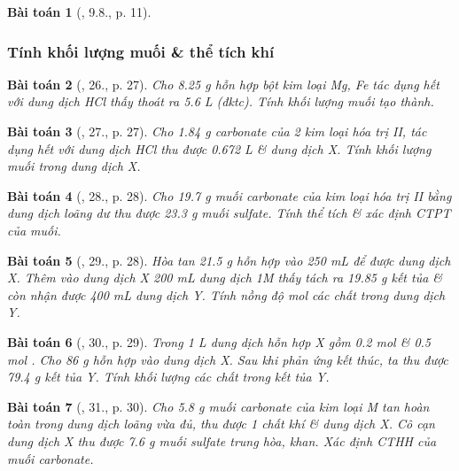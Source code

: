 \documentclass{article}
\newtheorem{baitoan}{Bài toán}
\begin{document}
\begin{baitoan}[\cite{SBT_Hoa_Hoc_9}, 9.8., p. 11]
	
\end{baitoan}

\subsubsection{Tính khối lượng muối \& thể tích khí }

\begin{baitoan}[\cite{An_350_BT_Hoa_Hoc_9}, 26., p. 27]
	Cho \emph{8.25 g} hỗn hợp bột kim loại \emph{Mg, Fe} tác dụng hết với dung dịch \emph{HCl} thấy thoát ra \emph{5.6 L } (đktc). Tính khối lượng muối tạo thành.
\end{baitoan}

\begin{baitoan}[\cite{An_350_BT_Hoa_Hoc_9}, 27., p. 27]
	Cho \emph{1.84 g} carbonate của 2 kim loại hóa trị II, tác dụng hết với dung dịch \emph{HCl} thu được \emph{0.672 L } \& dung dịch X. Tính khối lượng muối trong dung dịch X.
\end{baitoan}

\begin{baitoan}[\cite{An_350_BT_Hoa_Hoc_9}, 28., p. 28]
	Cho \emph{19.7 g} muối carbonate của kim loại hóa trị II bằng dung dịch \emph{} loãng dư thu được \emph{23.3 g} muối sulfate. Tính thể tích \emph{} \& xác định CTPT của muối.
\end{baitoan}

\begin{baitoan}[\cite{An_350_BT_Hoa_Hoc_9}, 29., p. 28]
	Hòa tan \emph{21.5 g} hỗn hợp \emph{} vào \emph{250 mL } để được dung dịch X. Thêm vào dung dịch X \emph{200 mL} dung dịch \emph{ 1M} thấy tách ra \emph{19.85 g} kết tủa \& còn nhận được \emph{400 mL} dung dịch Y. Tính nồng độ mol các chất trong dung dịch Y.
\end{baitoan}

\begin{baitoan}[\cite{An_350_BT_Hoa_Hoc_9}, 30., p. 29]
	Trong \emph{1 L} dung dịch hỗn hợp X gồm \emph{0.2 mol } \& \emph{0.5 mol }. Cho \emph{86 g} hỗn hợp \emph{} vào dung dịch X. Sau khi phản ứng kết thúc, ta thu được \emph{79.4 g} kết tủa Y. Tính khối lượng các chất trong kết tủa Y.
\end{baitoan}

\begin{baitoan}[\cite{An_350_BT_Hoa_Hoc_9}, 31., p. 30]
	Cho \emph{5.8 g} muối carbonate \emph{} của kim loại M tan hoàn toàn trong dung dịch \emph{} loãng vừa đủ, thu được 1 chất khí \& dung dịch X. Cô cạn dung dịch X thu được \emph{7.6 g} muối sulfate trung hòa, khan. Xác định CTHH của muối carbonate.
\end{baitoan}
\end{document}
